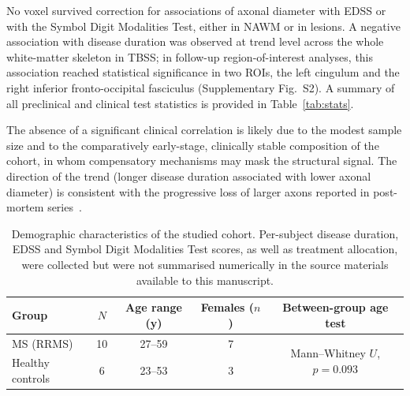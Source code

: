 \documentclass[11pt]{article}
\begin{document}
No voxel survived correction for associations of axonal diameter with EDSS or with the Symbol Digit Modalities Test, either in NAWM or in lesions. A negative association with disease duration was observed at trend level across the whole white-matter skeleton in TBSS; in follow-up region-of-interest analyses, this association reached statistical significance in two ROIs, the left cingulum and the right inferior fronto-occipital fasciculus (Supplementary Fig.~S2). A summary of all preclinical and clinical test statistics is provided in Table~\ref{tab:stats}.

The absence of a significant clinical correlation is likely due to the modest sample size and to the comparatively early-stage, clinically stable composition of the cohort, in whom compensatory mechanisms may mask the structural signal. The direction of the trend (longer disease duration associated with lower axonal diameter) is consistent with the progressive loss of larger axons reported in post-mortem series~\cite{tallantyre2010demyelinated,bergers2002axonal}.

\begin{table}[htbp]
\centering
\caption{Demographic characteristics of the studied cohort. Per-subject disease duration, EDSS and Symbol Digit Modalities Test scores, as well as treatment allocation, were collected but were not summarised numerically in the source materials available to this manuscript.}
\label{tab:cohort}
\begin{tabular}{lcccc}
\toprule
Group & $N$ & Age range (y) & Females ($n$) & Between-group age test \\
\midrule
MS (RRMS)        & 10 & 27--59 & 7 & \multirow{2}{*}{Mann--Whitney $U$, $p=0.093$} \\
Healthy controls &  6 & 23--53 & 3 &                                                 \\
\bottomrule
\end{tabular}
\end{table}
\end{document}

